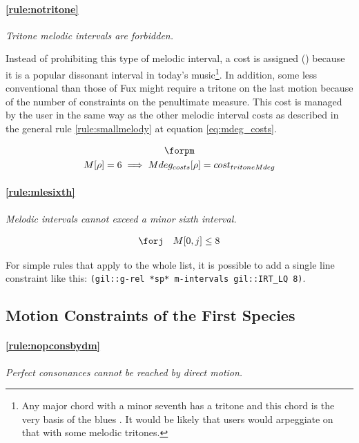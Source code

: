 \paragraph{\ref{rule:notritone}} \textit{Tritone melodic intervals are forbidden.}

Instead of prohibiting this type of melodic interval, a cost is assigned () because it is a popular dissonant interval in today's music\footnote{Any major chord with a minor seventh has a tritone and this chord is the very basis of the blues \parencite{Seventhwiki}. It would be likely that users would arpeggiate on that with some melodic tritones.}. In addition, some less conventional \cf than those of Fux might require a tritone on the last motion because of the number of constraints on the penultimate measure. This cost is managed by the user in the same way as the other melodic interval costs as described in the general rule \ref{rule:smallmelody} at equation \ref{eq:mdeg_costs}.

\begin{equation}
    \begin{gathered}
        \forpm\\
        M[\rho] = 6 \implies Mdeg_{costs}[\rho] = cost_{tritoneMdeg}\\
    \end{gathered}
\end{equation}

\paragraph{\ref{rule:mlesixth}} \textit{Melodic intervals cannot exceed a minor sixth interval.}

\begin{equation}
    \begin{gathered}
        \forj\quad
        M[0, j] \leq 8
    \end{gathered}
\end{equation}

For simple rules that apply to the whole list, it is possible to add a single line constraint like this: {\small\texttt{(gil::g-rel *sp* m-intervals gil::IRT\_LQ 8)}.}

\subsection{Motion Constraints of the First Species}

\paragraph{\ref{rule:nopconsbydm}} \textit{Perfect consonances cannot be reached by direct motion.}

